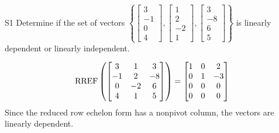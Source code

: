 \begin{problem}{S1}
Determine if the set of vectors $\left\{\begin{bmatrix} 3 \\ -1 \\ 0 \\ 4 \end{bmatrix}, \begin{bmatrix} 1  \\ 2 \\ -2 \\ 1 \end{bmatrix}, \begin{bmatrix} 3 \\ -8 \\ 6 \\ 5 \end{bmatrix} \right\}$  is linearly dependent or linearly independent.
\end{problem}
\begin{solution}
$$\operatorname{RREF}\left(\begin{bmatrix} 3 & 1 & 3 \\ -1 & 2 & -8 \\ 0 & -2 & 6 \\ 4 & 1 & 5 \end{bmatrix} \right) = \begin{bmatrix} 1 & 0 & 2 \\ 0 & 1 & -3 \\ 0 & 0 & 0 \\ 0 & 0 & 0 \end{bmatrix}$$
Since the reduced row echelon form has a nonpivot column, the vectors are linearly dependent.
\end{solution}

